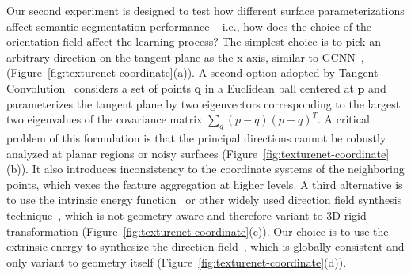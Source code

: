 Our second experiment is designed to test how different surface parameterizations affect semantic segmentation performance -- i.e., how does the choice of the orientation field affect the learning process?   The simplest choice is to pick an arbitrary direction on the tangent plane as the x-axis, similar to GCNN~\cite{masci2015geodesic}, (Figure~\ref{fig:texturenet-coordinate}(a)).  A second option adopted by Tangent Convolution~\cite{tatarchenko2018tangent} considers a set of points $\mathbf{q}$ in a Euclidean ball centered at $\mathbf{p}$ and parameterizes the tangent plane by two eigenvectors corresponding to the largest two eigenvalues of the covariance matrix $\sum_{q}(p-q)(p-q)^T$.  A critical problem of this formulation is that the principal directions cannot be robustly analyzed at planar regions or noisy surfaces (Figure~\ref{fig:texturenet-coordinate}(b)). It also introduces inconsistency to the coordinate systems of the neighboring points, which vexes the feature aggregation at higher levels.  A third alternative is to use the intrinsic energy function~\cite{jakob2015instant} or other widely used direction field synthesis technique~\cite{ray2008n,lai2010metric}, which is not geometry-aware and therefore variant to 3D rigid transformation (Figure~\ref{fig:texturenet-coordinate}(c)). Our choice is to use the extrinsic energy to synthesize the direction field~\cite{huang2018quadriflow,jakob2015instant}, which is globally consistent and only variant to geometry itself (Figure~\ref{fig:texturenet-coordinate}(d)).

